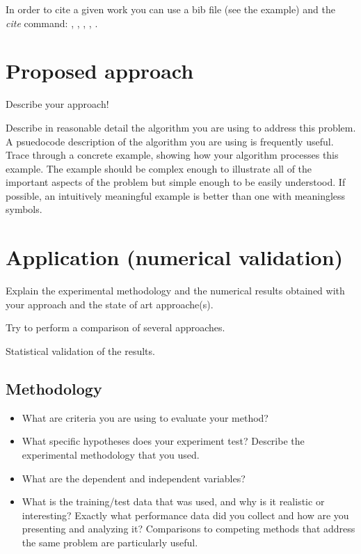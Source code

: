 \documentclass[runningheads,a4paper,11pt]{report}
\begin{document}
In order to cite a given work you can use a bib file (see the example) and the $\ $ \textit{cite} command:
\cite{kennedy1}, \cite{Koh06}, \cite{Berlekamp82}, \cite{Storn95}, \cite{firefox}.



\chapter{Proposed approach}
\label{chapter:proposedApproach}

Describe your approach!

Describe in reasonable detail the algorithm you are using to address this problem. A psuedocode description of the algorithm you are using is frequently useful. Trace through a concrete example, showing how your algorithm processes this example. The example should be complex enough to illustrate all of the important aspects of the problem but simple enough to be easily understood. If possible, an intuitively meaningful example is better than one with meaningless symbols.


\chapter{Application (numerical validation)}
\label{chapter:application}


Explain the experimental methodology and the numerical results obtained with your approach and the state of art approache(s).

Try to perform a comparison of several approaches.

Statistical validation of the results.


\section{Methodology}
\label{section:methodology}

\begin{itemize}
	\item What are criteria you are using to evaluate your method? 
	\item What specific hypotheses does your experiment test? Describe the experimental methodology that you used. 
	\item What are the dependent and independent variables? 
	\item What is the training/test data that was used, and why is it realistic or interesting? Exactly what performance data did you collect and how are you presenting and analyzing it? Comparisons to competing methods that address the same problem are particularly useful.
\end{itemize}
\end{document}
